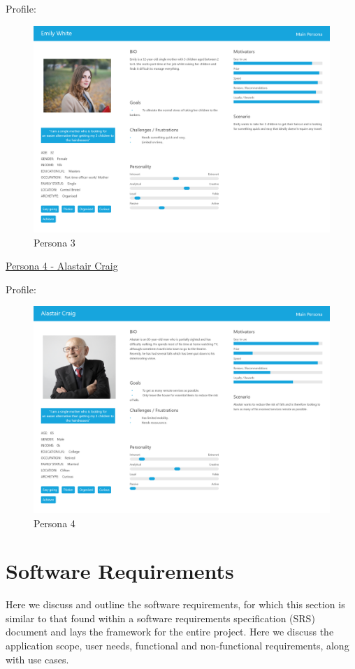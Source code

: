 \documentclass[12pt]{article}
\begin{document}
		Profile: 
		\begin{figure}[H]			
			\includegraphics[scale=0.2]{images/persona_3.png}
			\caption{Persona 3}
			\label{fig:persona_3}
		\end{figure}
		
		\underline{Persona 4 - Alastair Craig}
		
		
		Profile: 
		\begin{figure}[H]			
			\includegraphics[scale=0.2]{images/persona_4.png}
			\caption{Persona 4}
			\label{fig:persona_4}
		\end{figure}
			

	\section{Software Requirements}
	Here we discuss and outline the software requirements, for which this section is similar to that found within a software requirements specification (SRS) document and lays the framework for the entire project. Here we discuss the application scope, user needs, functional and non-functional requirements, along with use cases.
	
\end{document}
